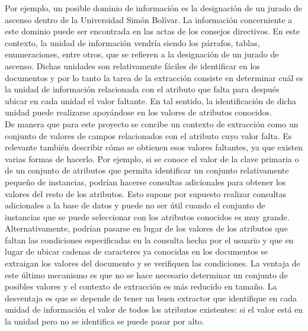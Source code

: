 Por ejemplo, un posible dominio de información es la designación de un jurado de ascenso dentro de la Universidad Simón Bolívar. La información concerniente a este dominio puede ser encontrada en las actas de los consejos directivos. En este contexto, la unidad de información vendría siendo los párrafos, tablas, enumeraciones, entre otros, que se refieren a la designación de un jurado de ascenso. Dichas unidades son relativamente fáciles de identificar en los documentos y por lo tanto la tarea de la extracción consiste en determinar cuál es la unidad de información relacionada con el atributo que falta para después ubicar en cada unidad el valor faltante. En tal sentido, la identificación de dicha unidad puede realizarse apoyándose en los valores de atributos conocidos. \\

De manera que para este proyecto se concibe un contexto de extracción como un conjunto de valores de campos relacionados con el atributo cuyo valor falta. Es relevante también describir cómo se obtienen esos valores faltantes, ya que existen varias formas de hacerlo. Por ejemplo, si se conoce el valor de la clave primaria o de un conjunto de atributos que permita identificar un conjunto relativamente pequeño de instancias, podrían hacerse consultas adicionales para obtener los valores del resto de los atributos. Esto supone por supuesto realizar consultas adicionales a la base de datos y puede no ser útil cuando el conjunto de instancias que se puede seleccionar con los atributos conocidos es muy grande. \\

Alternativamente, podrían pasarse en lugar de los valores de los atributos que faltan las condiciones especificadas en la consulta hecha por el usuario y que en lugar de ubicar cadenas de caracteres ya conocidas en los documentos se extraigan los valores del documento y se verifiquen las condiciones. La ventaja de este último mecanismo es que no se hace necesario determinar un conjunto de posibles valores y el contexto de extracción es más reducido en tamaño. La desventaja es que se depende de tener un buen extractor que identifique en cada unidad de información el valor de todos los atributos existentes: si el valor está en la unidad pero no se identifica se puede pasar por alto. \\ 


